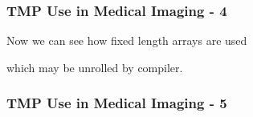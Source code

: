 \subsubsection{TMP Use in Medical Imaging -
4}\label{tmp-use-in-medical-imaging---4}

Now we can see how fixed length arrays are used

\begin{Shaded}
\begin{Highlighting}[]
\NormalTok{< }   
  
\NormalTok{::}\NormalTok{+=(} 
\NormalTok{\{}
   \NormalTok{( }  
    \NormalTok{\{}
    \NormalTok{( *} 
    \NormalTok{\}}
   \NormalTok{*}\NormalTok{;}
\NormalTok{\}}
\end{Highlighting}
\end{Shaded}

which may be unrolled by compiler.

\subsubsection{TMP Use in Medical Imaging -
5}\label{tmp-use-in-medical-imaging---5}

